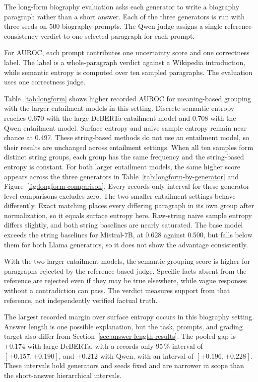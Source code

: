 The long-form biography evaluation asks each generator to write a biography paragraph rather
than a short answer. Each of the three generators is run with three seeds on
500 biography prompts. The Qwen judge assigns a single reference-consistency
verdict to one selected paragraph for each prompt.

For AUROC, each prompt contributes one uncertainty score and one correctness
label. The label is a whole-paragraph verdict against a Wikipedia introduction,
while semantic entropy is computed over ten sampled paragraphs. The evaluation
uses one correctness judge.

Table~\ref{tab:longform} shows higher recorded AUROC for meaning-based grouping
with the larger entailment models in this setting. Discrete semantic entropy
reaches 0.670 with the large DeBERTa entailment model and 0.708 with the Qwen
entailment model. Surface entropy and naive sample entropy remain near chance
at 0.497. These string-based methods do not use an entailment model, so their
results are unchanged across entailment settings. When all ten samples form
distinct string groups, each group has the same frequency and the string-based
entropy is constant. For both larger entailment models, the same higher score
appears across the three generators in Table~\ref{tab:longform-by-generator}
and Figure~\ref{fig:longform-comparison}. Every records-only interval for these
generator-level comparisons excludes zero. The two smaller entailment settings
behave differently. Exact matching places every differing paragraph in its own
group after normalization, so it equals surface entropy here. Raw-string
naive sample entropy differs slightly, and both string baselines are nearly saturated. The base model
exceeds the string baselines for Mistral-7B, at 0.628 against 0.500, but falls
below them for both Llama generators, so it does not show the advantage
consistently.



With the two larger entailment models, the semantic-grouping score is higher
for paragraphs rejected by the reference-based judge. Specific facts absent
from the reference are rejected even if they may be true elsewhere, while vague
responses without a contradiction can pass. The verdict measures support
from that reference, not independently verified factual truth.

The largest recorded margin over surface entropy occurs in this biography
setting. Answer length is one possible explanation, but the task, prompts, and
grading target also differ from Section~\ref{sec:answer-length-results}. The pooled gap is $+0.174$
with large DeBERTa, with a records-only 95\,\% interval of $[+0.157,+0.190]$,
and $+0.212$ with Qwen, with an interval of $[+0.196,+0.228]$. These intervals
hold generators and seeds fixed and are narrower in scope than the
short-answer hierarchical intervals.


